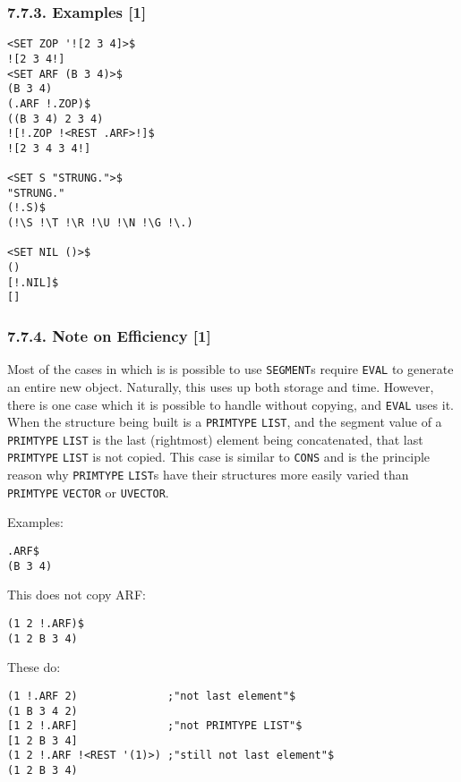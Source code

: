 \documentclass[a4paper,]{article}
\begin{document}
\subsubsection{7.7.3. Examples {[}1{]}}\label{examples-1-1}

\begin{verbatim}
<SET ZOP '![2 3 4]>$
![2 3 4!]
<SET ARF (B 3 4)>$
(B 3 4)
(.ARF !.ZOP)$
((B 3 4) 2 3 4)
![!.ZOP !<REST .ARF>!]$
![2 3 4 3 4!]

<SET S "STRUNG.">$
"STRUNG."
(!.S)$
(!\S !\T !\R !\U !\N !\G !\.)

<SET NIL ()>$
()
[!.NIL]$
[]
\end{verbatim}

\subsubsection{7.7.4. Note on Efficiency {[}1{]}}\label{note-on-efficiency-1}

Most of the cases in which is is possible to use \texttt{SEGMENT}s require \texttt{EVAL} to generate an entire new object.
Naturally, this uses up both storage and time. However, there is one case which it is possible to handle without copying,
and \texttt{EVAL} uses it. When the structure being built is a \texttt{PRIMTYPE} \texttt{LIST}, and
the segment value of a \texttt{PRIMTYPE} \texttt{LIST} is the last (rightmost) element being concatenated, that last
\texttt{PRIMTYPE} \texttt{LIST} is not copied. This case is similar to \texttt{CONS} and is the principle reason why
\texttt{PRIMTYPE} \texttt{LIST}s have their structures more easily varied than \texttt{PRIMTYPE} \texttt{VECTOR} or
\texttt{UVECTOR}.

Examples:

\begin{verbatim}
.ARF$
(B 3 4)
\end{verbatim}

This does not copy ARF:

\begin{verbatim}
(1 2 !.ARF)$
(1 2 B 3 4)
\end{verbatim}

These do:

\begin{verbatim}
(1 !.ARF 2)              ;"not last element"$
(1 B 3 4 2)
[1 2 !.ARF]              ;"not PRIMTYPE LIST"$
[1 2 B 3 4]
(1 2 !.ARF !<REST '(1)>) ;"still not last element"$
(1 2 B 3 4)
\end{verbatim}
\end{document}
